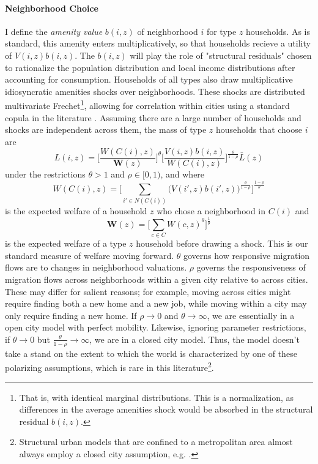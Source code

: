 \documentclass[]{article}
\begin{document}
\paragraph*{Neighborhood Choice} I define the \textit{amenity value} $b(i, z)$ of neighborhood $i$ for type $z$ households. As is standard, this amenity enters multiplicatively, so that households recieve a utility of $V(i, z)b(i, z)$. The $b(i, z)$ will play the role of "structural residuals" chosen to rationalize the population distribution and local income distributions after accounting for consumption. Households of all types also draw multiplicative idiosyncratic amenities shocks over neighborhoods. These shocks are distributed multivariate Frechet\footnote{That is, with identical marginal distributions. This is a normalization, as differences in the average amenities shock would be absorbed in the structural residual $b(i, z)$.}, allowing for correlation within cities using a standard copula in the literature \citep{propamp}. Assuming there are a large number of households and shocks are independent across them, the mass of type $z$ households that choose $i$ are
\begin{equation}\label{laboursupply}
	L(i, z) = \bigg[\frac{W(C(i), z)}{\boldsymbol{W}(z)}\bigg]^{\theta}\bigg[\frac{V(i, z)b(i, z)}{W(C(i), z)}\bigg]^{\frac{\theta}{1-\rho}}\bar{L}(z)
\end{equation}
 under the restrictions $\theta > 1$ and $\rho \in [0, 1)$, and where 
 \begin{equation*}
 	W(C(i), z) = \bigg[\sum_{i' \in N(C(i))}\big(V(i', z)b(i', z)\big)^{\frac{\theta}{1-\rho}}\bigg]^{\frac{1-\rho}{\theta}}
 \end{equation*} 
is the expected welfare of a household $z$ who chose a neighborhood in $C(i)$ and 
\begin{equation*}
\boldsymbol{W}(z) = \bigg[\sum_{c \in C} W(c, z)^{\theta}\bigg]^{\frac{1}{\theta}}	
\end{equation*}
is the expected welfare of a type $z$ household before drawing a shock. This is our standard measure of welfare moving forward. $\theta$ governs how responsive migration flows are to changes in neighborhood valuations. $\rho$ governs the responsiveness of migration flows across neighborhoods within a given city relative to across cities. These may differ for salient reasons; for example, moving across cities might require finding both a new home and a new job, while moving within a city may only require finding a new home. If $\rho \to 0$ and $\theta \to \infty$, we are essentially in a open city model with perfect mobility. Likewise, ignoring parameter restrictions, if $\theta \to 0$ but $\frac{\theta}{1-\rho} \to \infty$, we are in a closed city model. Thus, the model doesn't take a stand on the extent to which the world is characterized by one of these polarizing assumptions, which is rare in this literature\footnote{Structural urban models that are confined to a metropolitan area almost always employ a closed city assumption, e.g. \cite{acosta}.}. 
\end{document}
